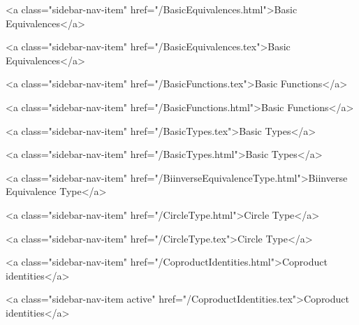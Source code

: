       
    
      
        
          <a class="sidebar-nav-item" href="/BasicEquivalences.html">Basic Equivalences</a>
        
      
    
      
        
          <a class="sidebar-nav-item" href="/BasicEquivalences.tex">Basic Equivalences</a>
        
      
    
      
        
          <a class="sidebar-nav-item" href="/BasicFunctions.tex">Basic Functions</a>
        
      
    
      
        
          <a class="sidebar-nav-item" href="/BasicFunctions.html">Basic Functions</a>
        
      
    
      
        
          <a class="sidebar-nav-item" href="/BasicTypes.tex">Basic Types</a>
        
      
    
      
        
          <a class="sidebar-nav-item" href="/BasicTypes.html">Basic Types</a>
        
      
    
      
        
          <a class="sidebar-nav-item" href="/BiinverseEquivalenceType.html">Biinverse Equivalence Type</a>
        
      
    
      
        
          <a class="sidebar-nav-item" href="/CircleType.html">Circle Type</a>
        
      
    
      
        
          <a class="sidebar-nav-item" href="/CircleType.tex">Circle Type</a>
        
      
    
      
        
          <a class="sidebar-nav-item" href="/CoproductIdentities.html">Coproduct identities</a>
        
      
    
      
        
          <a class="sidebar-nav-item active" href="/CoproductIdentities.tex">Coproduct identities</a>
        
